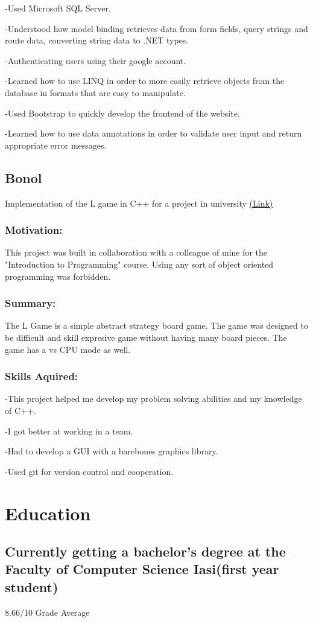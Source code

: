 \documentclass[a4paper,hidelinks,12pt]{article}
\begin{document}
-Used Microsoft SQL Server.  

-Understood how model binding retrieves data from form fields, query strings and route data, converting string
data to .NET types.

-Authenticating users using their google account.

-Learned how to use LINQ in order to more easily retrieve objects from the database in formats that are easy
to manipulate.

-Used Bootstrap to quickly develop the frontend of the website.

-Learned how to use data annotations in order to validate user input and return appropriate error messages.


\subsection{Bonol}
Implementation of the L game in C++ for a project in university \href{https://github.com/IureaMarius/ProiectIP}{(Link)}
\subsubsection{Motivation:}
This project was built in collaboration with a colleague of mine for the "Introduction to Programming" course.
Using any sort of object oriented programming was forbidden.
\subsubsection{Summary:}
The L Game is a simple abstract strategy board game. The game was designed to be difficult and skill expresive
game without having many board pieces. The game has a vs CPU mode as well.
\subsubsection{Skills Aquired:}
-This project helped me develop my problem solving abilities and my knowledge of C++.

-I got better at working in a team.

-Had to develop a GUI with a barebones graphics library.

-Used git for version control and cooperation.
\section{Education}
\subsection{Currently getting a bachelor's degree at 
the Faculty of Computer Science Iasi(first year student)}
 8.66/10 Grade Average
\end{document}
